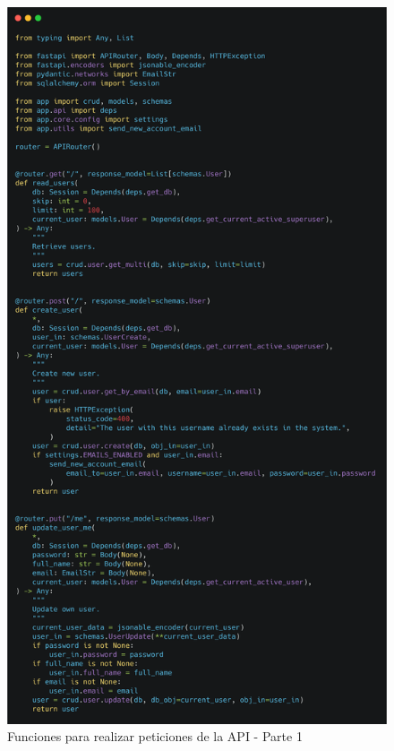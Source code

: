 \begin{figure}[!htb]
    \centering
    \includegraphics[scale=.10]{TT/img/implementacion/user_endpoint_1.png}
    \caption{Funciones para realizar peticiones de la API - Parte 1}
    \label{graphic:user_endpoint_1}    
\end{figure}

